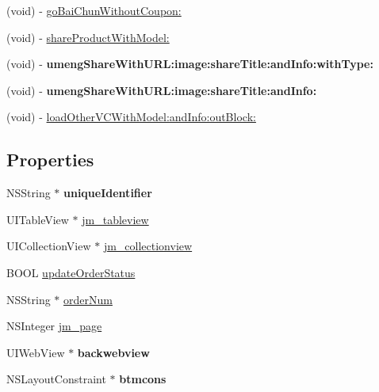 \begin{DoxyCompactItemize}
\item 
(void) -\/ \mbox{\hyperlink{interface_super_view_controller_a8792b0ac1730bbe199d74ab803df4592}{go\+Bai\+Chun\+Without\+Coupon\+:}}
\item 
(void) -\/ \mbox{\hyperlink{interface_super_view_controller_a7f39ea3d8c7b831c07aa963d9c0a95b2}{share\+Product\+With\+Model\+:}}
\item 
\mbox{\label{interface_super_view_controller_a445ddb1bb70adaed2f29845f4bf71275}} 
(void) -\/ {\bfseries umeng\+Share\+With\+U\+R\+L\+:image\+:share\+Title\+:and\+Info\+:with\+Type\+:}
\item 
\mbox{\label{interface_super_view_controller_ae190684b1d4174b4505acf877664a623}} 
(void) -\/ {\bfseries umeng\+Share\+With\+U\+R\+L\+:image\+:share\+Title\+:and\+Info\+:}
\item 
(void) -\/ \mbox{\hyperlink{interface_super_view_controller_a91b1b37610661a7de282a125a486b350}{load\+Other\+V\+C\+With\+Model\+:and\+Info\+:out\+Block\+:}}
\end{DoxyCompactItemize}
\subsection*{Properties}
\begin{DoxyCompactItemize}
\item 
\mbox{\label{interface_super_view_controller_ae74a8f31e1743e960a82054a28bb6c8f}} 
N\+S\+String $\ast$ {\bfseries unique\+Identifier}
\item 
U\+I\+Table\+View $\ast$ \mbox{\hyperlink{interface_super_view_controller_afbf00d31cca1d6f410202d2e2af37436}{jm\+\_\+tableview}}
\item 
U\+I\+Collection\+View $\ast$ \mbox{\hyperlink{interface_super_view_controller_a1afb83eb32eb7a23916d36fa2d0f18f2}{jm\+\_\+collectionview}}
\item 
B\+O\+OL \mbox{\hyperlink{interface_super_view_controller_a2ce67e1d8840d253941c3851d615fed8}{update\+Order\+Status}}
\item 
N\+S\+String $\ast$ \mbox{\hyperlink{interface_super_view_controller_ae94d34bc13fb1d2af67ac108ad24eac5}{order\+Num}}
\item 
N\+S\+Integer \mbox{\hyperlink{interface_super_view_controller_a474f37174ed6bfc41b59b32b042f45df}{jm\+\_\+page}}
\item 
\mbox{\label{interface_super_view_controller_ae453a34f09c740ecf1d11f3bb88d6581}} 
U\+I\+Web\+View $\ast$ {\bfseries backwebview}
\item 
\mbox{\label{interface_super_view_controller_a31e6734b6e09de39fc09d88615dfc911}} 
N\+S\+Layout\+Constraint $\ast$ {\bfseries btmcons}
\end{DoxyCompactItemize}


